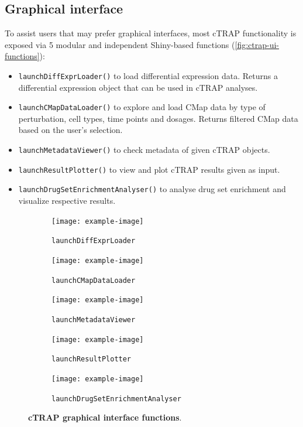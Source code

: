 \subsection{Graphical interface}

To assist users that may prefer graphical interfaces, most cTRAP functionality is exposed via 5 modular and independent Shiny-based functions (\autoref{fig:ctrap-ui-functions}):

\begin{itemize}
	\item \texttt{launchDiffExprLoader()} to load differential expression data. Returns a differential expression object that can be used in cTRAP analyses.
	\item \texttt{launchCMapDataLoader()} to explore and load CMap data by type of perturbation, cell types, time points and dosages. Returns filtered CMap data based on the user's selection.
	\item \texttt{launchMetadataViewer()} to check metadata of given cTRAP objects.
	\item \texttt{launchResultPlotter()} to view and plot cTRAP results given as input.
	\item \texttt{launchDrugSetEnrichmentAnalyser()} to analyse drug set enrichment and visualize respective results.
\end{itemize}

\begin{figure}[!h]
	\centering
	\begin{subfigure}[h]{0.3\textwidth}
		\texttt{[image: example-image]}
		\caption{\footnotesize{\texttt{launchDiffExprLoader}}}
	\end{subfigure}
	\begin{subfigure}[h]{0.3\textwidth}
		\texttt{[image: example-image]}
		\caption{\footnotesize{\texttt{launchCMapDataLoader}}}
	\end{subfigure}
	\begin{subfigure}[h]{0.3\textwidth}
		\texttt{[image: example-image]}
		\caption{\footnotesize{\texttt{launchMetadataViewer}}}
	\end{subfigure}
	\begin{subfigure}[h]{0.45\textwidth}
		\texttt{[image: example-image]}
		\caption{\footnotesize{\texttt{launchResultPlotter}}}
	\end{subfigure}
	\begin{subfigure}[h]{0.45\textwidth}
		\texttt{[image: example-image]}
		\caption{\footnotesize{\texttt{launchDrugSetEnrichmentAnalyser}}}
	\end{subfigure}
	\caption[cTRAP graphical interface functions]{\textbf{cTRAP graphical interface functions}.}
	\label{fig:ctrap-ui-functions}
\end{figure}

